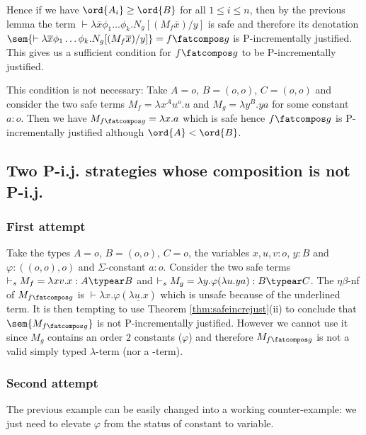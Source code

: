Hence if we have $\ord{A_i}\geq\ord{B}$
for all $1 \leq i \leq n$,
then by the previous lemma the term $\vdash \lambda \overline{x} \phi_1 \dots \phi_k. N_g [(M_f \overline{x}) / y]$
is safe and therefore its denotation $\sem{\vdash \lambda \overline{x} \phi_1 \dots \phi_k. N_g [(M_f \overline{x}) / y]} = f\fatcompos g$ is P-incrementally justified.
This gives us a sufficient condition for $f\fatcompos g$ to be P-incrementally justified.

This condition is not necessary: Take $A=o$, $B=(o,o)$, $C=(o,o)$ and consider the two safe terms $M_f = \lambda x^A u^o.u$ and $M_g = \lambda y^B . y a$ for  some constant $a:o$. Then we have $M_{f\fatcompos g} = \lambda x . a$ which is safe hence $f\fatcompos g$ is P-incrementally justified although $\ord{A} < \ord{B}$.





\subsection{Two P-i.j. strategies whose composition is not P-i.j.}
\subsubsection{First attempt}

Take the types $A=o$, $B=(o,o)$, $C=o$, the variables
$x,u,v:o$, $y:B$ and $\varphi:((o,o),o)$ and $\Sigma$-constant $a:o$.
Consider the two safe terms $\vdash_s  M_f = \lambda xv.x : A\typear B$ and $\vdash_s M_g = \lambda y . \varphi (\lambda u . y a) : B\typear C$.
The $\eta\beta$-nf of $M_{f\fatcompos g}$ is $\vdash \lambda x . \varphi (\underline{\lambda u . x})$ which is unsafe because of the underlined term. It is then tempting to use
Theorem \ref{thm:safeincrejust}(ii) to conclude that
$\sem{M_{f\fatcompos g}}$ is not P-incrementally justified. However we cannot use it since $M_g$ contains an order $2$ constants ($\varphi$) and therefore
$M_{f\fatcompos g}$ is not a valid simply typed $\lambda$-term (nor a \pcf-term).

\subsubsection{Second attempt}
The previous example can be easily changed into a working counter-example: we just need to elevate $\varphi$ from the status of constant to variable.

